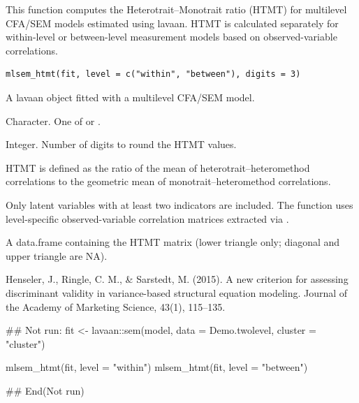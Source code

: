 \documentclass[a4paper]{book}
\begin{document}
%
\begin{Description}
This function computes the Heterotrait–Monotrait ratio (HTMT)
for multilevel CFA/SEM models estimated using lavaan.
HTMT is calculated separately for within-level or between-level
measurement models based on observed-variable correlations.
\end{Description}
%
\begin{Usage}
\begin{verbatim}
mlsem_htmt(fit, level = c("within", "between"), digits = 3)
\end{verbatim}
\end{Usage}
%
\begin{Arguments}
\begin{ldescription}
\item[\code{fit}] A lavaan object fitted with a multilevel CFA/SEM model.

\item[\code{level}] Character. One of  or .

\item[\code{digits}] Integer. Number of digits to round the HTMT values.
\end{ldescription}
\end{Arguments}
%
\begin{Details}
HTMT is defined as the ratio of the mean of heterotrait–heteromethod
correlations to the geometric mean of monotrait–heteromethod
correlations.

Only latent variables with at least two indicators are included.
The function uses level-specific observed-variable correlation
matrices extracted via .
\end{Details}
%
\begin{Value}
A data.frame containing the HTMT matrix
(lower triangle only; diagonal and upper triangle are NA).
\end{Value}
%
\begin{References}
Henseler, J., Ringle, C. M., \& Sarstedt, M. (2015).
A new criterion for assessing discriminant validity in
variance-based structural equation modeling.
Journal of the Academy of Marketing Science, 43(1), 115–135.
\end{References}
%
\begin{Examples}
\begin{ExampleCode}
## Not run: 
fit <- lavaan::sem(model, data = Demo.twolevel, cluster = "cluster")

mlsem_htmt(fit, level = "within")
mlsem_htmt(fit, level = "between")

## End(Not run)
\end{ExampleCode}
\end{Examples}
\end{document}
